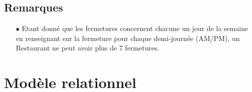 \documentclass[a4paper, 11pt]{article}
\begin{document}
\subsection*{Remarques}
\begin{itemize}
	\item[$\bullet$] Etant donné que les fermetures concernent chacune un jour de la semaine en renseignant sur la fermeture pour chaque demi-journée (AM/PM), un Restaurant ne peut avoir plus de 7 fermetures. 
\end{itemize}

\section*{Modèle relationnel}
\end{document}
